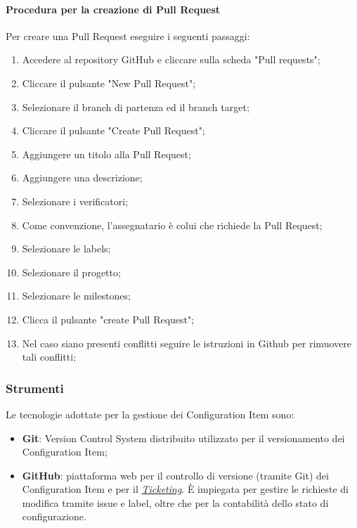 \hypertarget{par:creazionePR}{\paragraph*{Procedura per la creazione di Pull Request}} 
Per creare una Pull Request eseguire i seguenti passaggi:
\begin{enumerate}
    \item Accedere al repository GitHub e cliccare sulla scheda "Pull requests";
    \item Cliccare il pulsante "New Pull Request";
    \item Selezionare il branch di partenza ed il branch target;
    \item Cliccare il pulsante "Create Pull Request";
    \item Aggiungere un titolo alla Pull Request;
    \item Aggiungere una descrizione;
    \item Selezionare i verificatori;
    \item Come convenzione, l'assegnatario è colui che richiede la Pull Request;
    \item Selezionare le labels;
    \item Selezionare il progetto;
    \item Selezionare le milestones;
    \item Clicca il pulsante "create Pull Request";
    \item Nel caso siano presenti conflitti seguire le istruzioni in Github per rimuovere tali conflitti;
\end{enumerate}

\subsubsection{Strumenti}
Le tecnologie adottate per la gestione dei Configuration Item sono:
\begin{itemize}
    \item \textbf{Git}: Version Control System distribuito utilizzato per il versionamento dei Configuration Item;
    \item \textbf{GitHub}: piattaforma web per il controllo di versione (tramite Git) dei Configuration Item e per il \hyperlink{par:ticketing}{\textit{Ticketing}}. È impiegata per gestire le richieste di modifica tramite issue e label, oltre che per la contabilità dello stato di configurazione.
\end{itemize}
